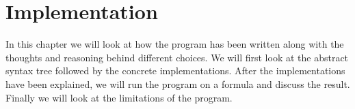 \chapter{Implementation}
\label{04}

In this chapter we will look at how the program has been written along with the thoughts and reasoning behind different choices. We will first look at the abstract syntax tree followed by the concrete implementations. After the implementations have been explained, we will run the program on a formula and discuss the result. Finally we will look at the limitations of the program.




